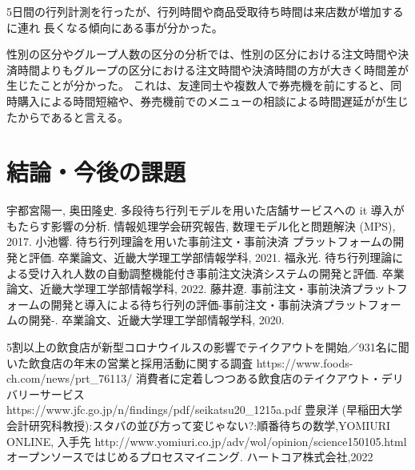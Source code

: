 \documentclass{jsarticle}
\begin{document}
5日間の行列計測を行ったが、行列時間や商品受取待ち時間は来店数が増加するに連れ
長くなる傾向にある事が分かった。

性別の区分やグループ人数の区分の分析では、性別の区分における注文時間や決済時間よりもグループの区分における注文時間や決済時間の方が大きく時間差が生じたことが分かった。
これは、友達同士や複数人で券売機を前にすると、同時購入による時間短縮や、券売機前でのメニューの相談による時間遅延がが生じたからであると言える。





\newpage

\section{結論・今後の課題}






\newpage

\begin{thebibliography}{99}
 宇都宮陽一, 奥田隆史. 多段待ち行列モデルを用いた店舗サービスへの it 導入がもたらす影響の分析. 情報処理学会研究報告, 数理モデル化と問題解決 (MPS), 2017.
 小池響. 待ち行列理論を用いた事前注文・事前決済 プラットフォームの開発と評価. 卒業論文、近畿大学理工学部情報学科, 2021.
 福永光. 待ち行列理論による受け入れ人数の自動調整機能付き事前注文決済システムの開発と評価. 卒業論文、近畿大学理工学部情報学科, 2022.
藤井遼. 事前注文・事前決済プラットフォームの開発と導入による待ち行列の評価-事前注文・事前決済プラットフォームの開発-. 卒業論文、近畿大学理工学部情報学科, 2020.

5割以上の飲食店が新型コロナウイルスの影響でテイクアウトを開始／931名に聞いた飲食店の年末の営業と採用活動に関する調査 https://www.foods-ch.com/news/prt\_76113/  
消費者に定着しつつある飲食店のテイクアウト・デリバリーサービス\\
https://www.jfc.go.jp/n/findings/pdf/seikatsu20\_1215a.pdf
豊泉洋 (早稲田大学会計研究科教授):スタバの並び方って変じゃない?:順番待ちの数学,YOMIURI ONLINE, 入手先 http://www.yomiuri.co.jp/adv/wol/opinion/science150105.html
オープンソースではじめるプロセスマイニング. ハートコア株式会社,2022
\end{thebibliography}
\end{document}
